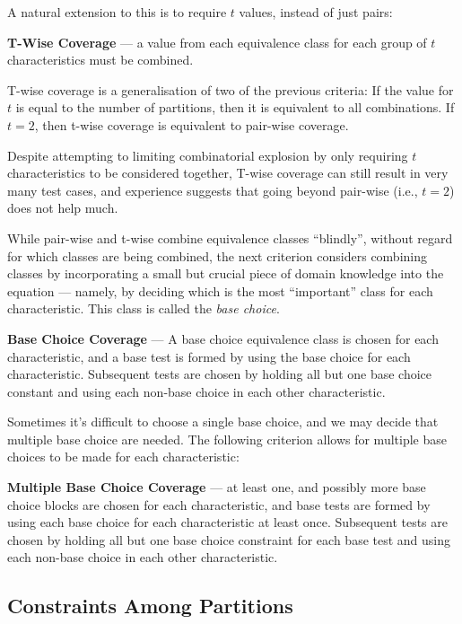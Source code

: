 A natural extension to this is to require $t$ values, instead of just pairs:

{\bf T-Wise Coverage} --- a value from each equivalence class for each group of
$t$ characteristics must be combined.

T-wise coverage is a generalisation of two of the previous criteria: If the value for
$t$ is equal to the number of partitions, then it is equivalent to all
combinations. If $t=2$, then t-wise coverage is equivalent to pair-wise
coverage.

Despite attempting to limiting combinatorial explosion by only requiring $t$
characteristics to be considered together, T-wise coverage can still result in
very many test cases, and experience suggests that going beyond pair-wise (i.e.,
$t=2$) does not help much.

While pair-wise and t-wise combine equivalence classes ``blindly'', without
regard for which classes are being combined, the next criterion considers
combining classes by incorporating a small but crucial piece of domain knowledge
into the equation --- namely, by deciding which is the most ``important'' class
for each characteristic. This class is called the {\it base choice}.

{\bf Base Choice Coverage} --- A base choice equivalence class is chosen for
each characteristic, and a base test is formed by using the base choice for each
characteristic. Subsequent tests are chosen by holding all but one base choice
constant and using each non-base choice in each other characteristic.

Sometimes it's difficult to choose a single base choice, and we may decide that
multiple base choice are needed. The following criterion allows for multiple
base choices to be made for each characteristic:

{\bf Multiple Base Choice Coverage} --- at least one, and possibly more base
choice blocks are chosen for each characteristic, and base tests are formed by
using each base choice for each characteristic at least once. Subsequent tests
are chosen by holding all but one base choice constraint for each base test and
using each non-base choice in each other characteristic.


\subsection{Constraints Among Partitions}

